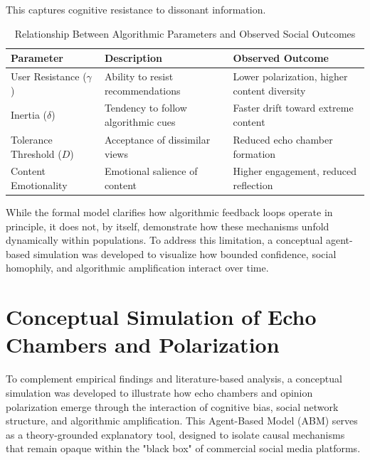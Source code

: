 \documentclass[12pt,a4paper]{report}
\begin{document}
This captures cognitive resistance to dissonant information.

\begin{table}[H]
  \centering
  \caption{Relationship Between Algorithmic Parameters and Observed Social Outcomes}
  \begin{tabular}{p{4cm}p{4cm}p{6cm}}
    \hline
    \textbf{Parameter} & \textbf{Description} & \textbf{Observed Outcome} \\
    \hline
    User Resistance ($\gamma$) & Ability to resist recommendations & Lower polarization, higher content diversity \\
    Inertia ($\delta$) & Tendency to follow algorithmic cues & Faster drift toward extreme content \\
    Tolerance Threshold ($D$) & Acceptance of dissimilar views & Reduced echo chamber formation \\
    Content Emotionality & Emotional salience of content & Higher engagement, reduced reflection \\
    \hline
  \end{tabular}
\end{table}

While the formal model clarifies how algorithmic feedback loops operate in principle, it does not, by itself, demonstrate how these mechanisms unfold dynamically within populations. To address this limitation, a conceptual agent-based simulation was developed to visualize how bounded confidence, social homophily, and algorithmic amplification interact over time.



\section{Conceptual Simulation of Echo Chambers and Polarization}

To complement empirical findings and literature-based analysis, a conceptual simulation was developed to illustrate how echo chambers and opinion polarization emerge through the interaction of cognitive bias, social network structure, and algorithmic amplification. This Agent-Based Model (ABM) serves as a theory-grounded explanatory tool, designed to isolate causal mechanisms that remain opaque within the "black box" of commercial social media platforms.
\end{document}
